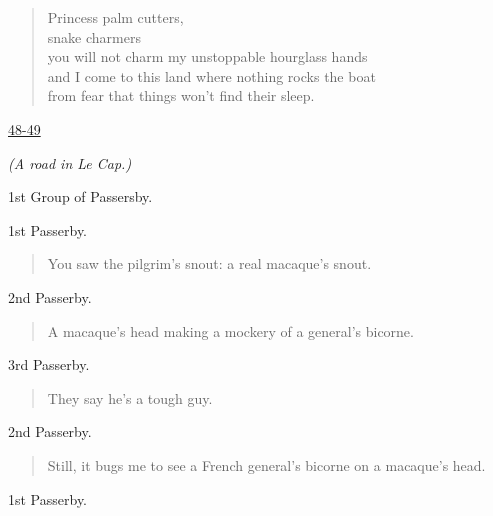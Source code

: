 \documentclass[letterpaper,article,12pt,oneside,notitlepage]{memoir}
\begin{document}
\begin{verse}
Princess palm cutters, \\
snake charmers \\
you will not charm my unstoppable hourglass hands \\
and I come to this land where nothing rocks the boat \\
from fear that things won't find their sleep. \\
\end{verse}

\clearpage

\href{http://cesaire.elotroalex.com/chiens/chiens/p048.html}{48-49}

\textit{(A road in Le Cap.)}

\begin{center}1st Group of Passersby.\end{center}

\begin{center}1st Passerby.\end{center}

\begin{verse}
You saw the pilgrim's snout: a real macaque's snout. \\
\end{verse}

\begin{center}2nd Passerby.\end{center}

\begin{verse}
A macaque's head making a mockery of a general's bicorne. \\
\end{verse}

\begin{center}3rd Passerby.\end{center}

\begin{verse}
They say he's a tough guy. \\
\end{verse}

\begin{center}2nd Passerby.\end{center}

\begin{verse}
Still, it bugs me to see a French general's bicorne on a macaque's head. \\
\end{verse}

\begin{center}1st Passerby.\end{center}
\end{document}
